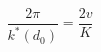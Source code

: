 \documentclass{article}
\begin{document}
\begin{equation}
    \frac{2\pi}{k^*\left( d_0 \right)}=\frac{2v}{K}
    \label{eq:criticalLineOfKD0}
\end{equation}




\end{document}
